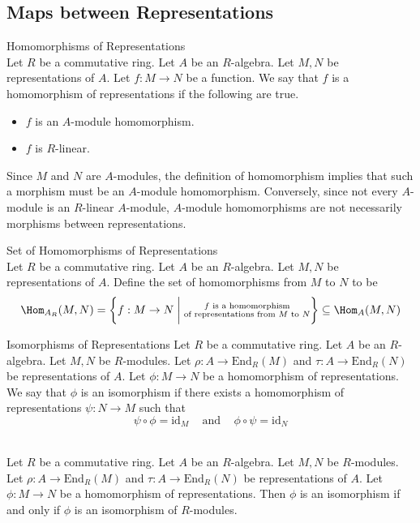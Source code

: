 \documentclass[a4paper]{article}
\begin{document}
\subsection{Maps between Representations}
\begin{defn}{Homomorphisms of Representations}{}\\
Let $R$ be a commutative ring. Let $A$ be an $R$-algebra. Let $M,N$ be representations of $A$. Let $f:M\to N$ be a function. We say that $f$ is a homomorphism of representations if the following are true. 
\begin{itemize}
\item $f$ is an $A$-module homomorphism. 
\item $f$ is $R$-linear. 
\end{itemize}
\end{defn}

Since $M$ and $N$ are $A$-modules, the definition of homomorphism implies that such a morphism must be an $A$-module homomorphism. Conversely, since not every $A$-module is an $R$-linear $A$-module, $A$-module homomorphisms are not necessarily morphisms between representations. 

\begin{defn}{Set of Homomorphisms of Representations}{}\\
Let $R$ be a commutative ring. Let $A$ be an $R$-algebra. Let $M,N$ be representations of $A$. Define the set of homomorphisms from $M$ to $N$ to be $$\Hom_{A_R}(M,N)=\left\{f:M\to N\;\bigg{|}\;\substack{f\text{ is a homomorphism}\\\text{of representations from }M\text{ to }N}\right\}\subseteq\Hom_A(M,N)$$
\end{defn}

\begin{defn}{Isomorphisms of Representations}{}
Let $R$ be a commutative ring. Let $A$ be an $R$-algebra. Let $M,N$ be $R$-modules. Let $\rho:A\to\text{End}_R(M)$ and $\tau:A\to\text{End}_R(N)$ be representations of $A$. Let $\phi:M\to N$ be a homomorphism of representations. We say that $\phi$ is an isomorphism if there exists a homomorphism of representations $\psi:N\to M$ such that $$\psi\circ\phi=\text{id}_M\;\;\;\text{ and }\;\;\;\phi\circ\psi=\text{id}_N$$
\end{defn}

\begin{lmm}{}{}\\
Let $R$ be a commutative ring. Let $A$ be an $R$-algebra. Let $M,N$ be $R$-modules. Let $\rho:A\to\text{End}_R(M)$ and $\tau:A\to\text{End}_R(N)$ be representations of $A$. Let $\phi:M\to N$ be a homomorphism of representations. Then $\phi$ is an isomorphism if and only if $\phi$ is an isomorphism of $R$-modules. 
\end{lmm}
\end{document}
